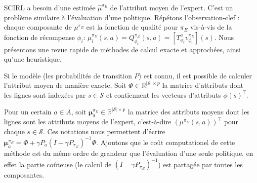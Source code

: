\documentclass[french,utf8]{./hermes-journal}
\newcommand{\s}{\mathcal{S}}
\newcommand{\A}{\mathcal{A}}
\newcommand{\Mu}{\boldsymbol{\mu}}
\begin{document}
SCIRL a besoin d'une estimée $\hat{\mu}^{\pi_E}$ de l'attribut moyen de l'expert. C'est un problème similaire à l'évaluation d'une politique. Répétons l'observation-clef : chaque composante de 
$\mu^{\pi_E}$ est la fonction de qualité pour $\pi_E$ vis-à-vis de la fonction de récompense $\phi_i$: $\mu_i^{\pi_E}(s,a) = Q^{\pi_E}_{\phi_i}(s,a) =
[T^a_{\phi_i} v^{\pi_E}_{\phi_i}](s)$. Nous présentons une revue rapide de méthodes de calcul exacte et approchées, ainsi qu'une heuristique.

Si le modèle (les probabilités de transition $P$) est connu, il est possible de calculer l'attribut moyen de manière exacte. Soit $\Phi\in\mathbb{R}^{|\s|\times p}$ la matrice d'attributs dont les lignes sont indexées par $s\in\s$ et contiennent les vecteurs d'attributs $\phi(s)^\top$.

%
%
Pour un certain $a\in A$, soit $\Mu^{\pi_E}_a \in\mathbb{R}^{|\s|\times
p}$ la matrice des attributs moyens dont les lignes sont les attributs moyens de l'expert, c'est-à-dire  $(\mu^{\pi_E}(s,a))^\top$ pour chaque $s\in\s$.
Ces notations nous permettent d'écrire $\Mu_a^{\pi_E} = \Phi + \gamma
P_a(I-\gamma P_{\pi_E})^{-1} \Phi$.
Ajoutons que le coût computationel de cette méthode est du même ordre de grandeur que l'évaluation d'une seule politique, en effet la partie coûteuse (le calcul de $(I-\gamma P_{\pi_E})^{-1}$) est partagée par toutes les composantes.
\end{document}
